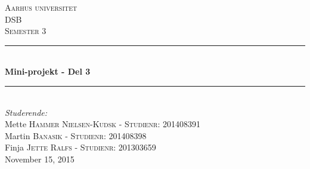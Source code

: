 \documentclass[12pt, letterpaper]{article}
\begin{document}
\begin{titlepage}

\newcommand{\HRule}{\rule{\linewidth}{0.5mm}} %

\center %
 

\textsc{\LARGE Aarhus universitet}\\[1.5cm] %
\textsc{\Large DSB}\\[0.5cm] %
\textsc{\large Semester 3}\\[0.5cm] %


\HRule \\[0.4cm]
{ \huge \bfseries Mini-projekt - Del 3}\\[0.4cm] %
\HRule \\[1.5cm]
 

\Large \emph{Studerende:}\\[1cm]
Mette \textsc{Hammer Nielsen-Kudsk - Studienr: 201408391}\\[0,5cm] %
Martin \textsc{Banasik - Studienr: 201408398}\\[0,5cm] %
Finja \textsc{Jette Ralfs - Studienr: 201303659}\\[0,5cm] %

{\large November 15, 2015}\\[1,2cm] %


\end{titlepage}
\end{document}
